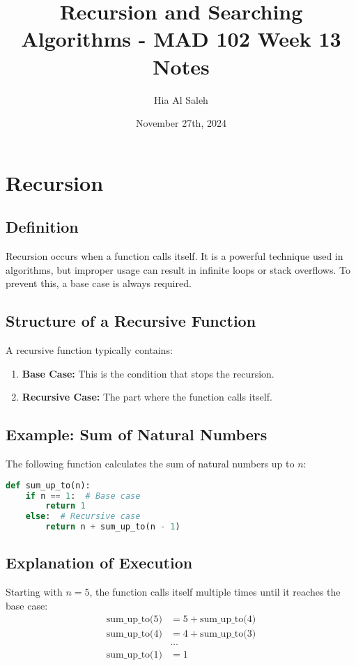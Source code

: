 \documentclass{article}
\title{Recursion and Searching Algorithms - MAD 102 Week 13 Notes}
\author{Hia Al Saleh}
\date{November 27th, 2024}
\begin{document}
\maketitle
\tableofcontents
\newpage

\section{Recursion}
\subsection{Definition}
Recursion occurs when a function calls itself. It is a powerful technique used in algorithms, but improper usage can result in infinite loops or stack overflows. To prevent this, a base case is always required.

\subsection{Structure of a Recursive Function}
A recursive function typically contains:
\begin{enumerate}
    \item \textbf{Base Case:} This is the condition that stops the recursion.
    \item \textbf{Recursive Case:} The part where the function calls itself.
\end{enumerate}

\subsection{Example: Sum of Natural Numbers}
The following function calculates the sum of natural numbers up to \(n\):
\begin{lstlisting}[language=Python]
def sum_up_to(n):
    if n == 1:  # Base case
        return 1
    else:  # Recursive case
        return n + sum_up_to(n - 1)
\end{lstlisting}

\subsection{Explanation of Execution}
Starting with \(n = 5\), the function calls itself multiple times until it reaches the base case:
\[
\begin{aligned}
    \text{sum\_up\_to(5)} & = 5 + \text{sum\_up\_to(4)} \\
    \text{sum\_up\_to(4)} & = 4 + \text{sum\_up\_to(3)} \\
    & \dots \\
    \text{sum\_up\_to(1)} & = 1
\end{aligned}
\]
\end{document}
